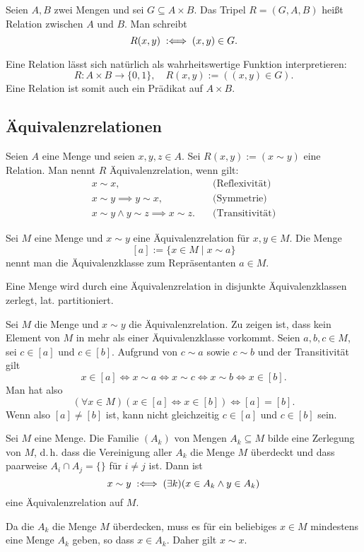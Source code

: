 \begin{Definition}[Relation]
Seien $A,B$ zwei Mengen und sei $G\subseteq A\times B$.
Das Tripel $R=(G,A,B)$ heißt Relation zwischen $A$ und $B$.
Man schreibt
\[R(x,y) \;:\Longleftrightarrow\; (x,y)\in G.\]
\end{Definition}
Eine Relation lässt sich natürlich als wahrheitswertige Funktion
interpretieren:
\[R\colon A\times B\to\{0,1\},\quad R(x,y):=((x,y)\in G).\]
Eine Relation ist somit auch ein Prädikat auf $A\times B$.

\subsection{Äquivalenzrelationen}
\begin{Definition}[Äquivalenzrelation]
Seien $A$ eine Menge und seien $x,y,z\in A$. Sei $R(x,y):=(x\sim y)$ eine
Relation. Man nennt $R$ Äquivalenzrelation, wenn gilt:
\[\begin{array}{ll}
x\sim x, &\text{(Reflexivität)}\\
x\sim y \implies y\sim x, & \text{(Symmetrie)}\\
x\sim y\land y\sim z\implies x\sim z.\quad & \text{(Transitivität)}
\end{array}\]
\end{Definition}

\begin{Definition}[Äquivalenzklasse]
Sei $M$ eine Menge und $x\sim y$ eine Äquivalenzrelation für $x,y\in M$.
Die Menge%
\[[a] := \{x\in M\mid x\sim a\}\]
nennt man die Äquivalenzklasse zum Repräsentanten $a\in M$.
\end{Definition}

\begin{Satz}
Eine Menge wird durch eine Äquivalenzrelation in disjunkte
Äquivalenzklassen zerlegt, lat. partitioniert.
\end{Satz}
 Sei $M$ die Menge und $x\sim y$ die Äquivalenzrelation.
Zu zeigen ist, dass kein Element von $M$ in mehr als einer
Äquivalenzklasse vorkommt. Seien $a,b,c\in M$, sei $c\in [a]$
und $c\in [b]$. Aufgrund von $c\sim a$ sowie $c\sim b$ und der
Transitivität gilt%
\[x\in [a]\iff x\sim a\iff x\sim c\iff x\sim b\iff x\in [b].\]
Man hat also
\[(\forall x\in M)(x\in [a]\Leftrightarrow x\in [b])\iff [a]=[b].\]
Wenn also $[a]\ne [b]$ ist, kann nicht gleichzeitig $c\in [a]$ und $c\in [b]$
sein.\;\qedsymbol

\begin{Satz}
Sei $M$ eine Menge. Die Familie $(A_k)$ von Mengen $A_k\subseteq M$
bilde eine Zerlegung von $M$, d.\,h. dass die Vereinigung aller
$A_k$ die Menge $M$ überdeckt und dass paarweise $A_i\cap A_j=\{\}$
für $i\ne j$ ist. Dann ist%
\[x\sim y\;:\Longleftrightarrow\; (\exists k)(x\in A_k\land y\in A_k)\]
eine Äquivalenzrelation auf $M$.
\end{Satz}
 Da die $A_k$ die Menge $M$ überdecken,
muss es für ein beliebiges $x\in M$ mindestens eine Menge $A_k$
geben, so dass $x\in A_k$. Daher gilt $x\sim x$.

